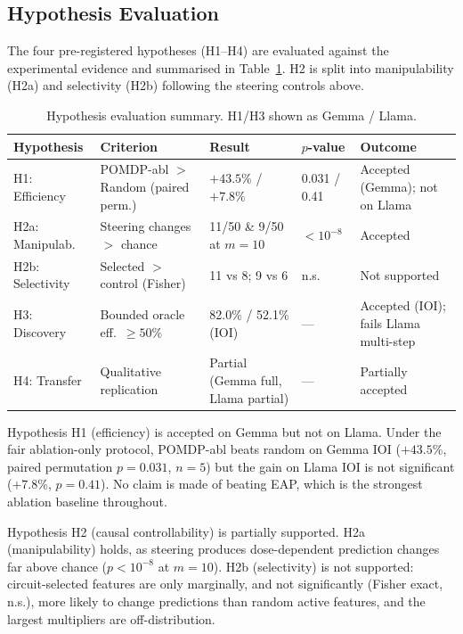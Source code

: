 \subsection{Hypothesis Evaluation}

The four pre-registered hypotheses (H1--H4) are evaluated against the
experimental evidence and summarised in
Table~\ref{tab:hypothesis_eval}.  H2 is split into manipulability
(H2a) and selectivity (H2b) following the steering controls above.

\begin{table}[H]
\centering
\caption{Hypothesis evaluation summary.  H1/H3 shown as Gemma / Llama.}
\label{tab:hypothesis_eval}
{\footnotesize
\begin{tabular}{p{2.0cm}p{3.4cm}p{2.6cm}p{1.8cm}p{2.4cm}}
\toprule
\textbf{Hypothesis} & \textbf{Criterion} & \textbf{Result} & \textbf{$p$-value} & \textbf{Outcome} \\
\midrule
H1: Efficiency  & POMDP-abl $>$ Random (paired perm.) & $+43.5\%$ / $+7.8\%$ & 0.031 / 0.41 & Accepted (Gemma); not on Llama \\
H2a: Manipulab. & Steering changes $>$ chance & 11/50 \& 9/50 at $m{=}10$ & $<10^{-8}$ & Accepted \\
H2b: Selectivity & Selected $>$ control (Fisher) & 11 vs 8; 9 vs 6 & n.s. & Not supported \\
H3: Discovery    & Bounded oracle eff.\ $\geq 50\%$ & 82.0\% / 52.1\% (IOI) & --- & Accepted (IOI); fails Llama multi-step \\
H4: Transfer     & Qualitative replication & Partial (Gemma full, Llama partial) & --- & Partially accepted \\
\bottomrule
\end{tabular}%
}
\end{table}

Hypothesis H1 (efficiency) is accepted on Gemma but not on Llama. Under the fair
ablation-only protocol, POMDP-abl beats random on Gemma IOI ($+43.5\%$,
paired permutation $p=0.031$, $n=5$) but the gain on Llama IOI is not significant
($+7.8\%$, $p=0.41$). No claim is made of beating EAP, which is the strongest
ablation baseline throughout.

Hypothesis H2 (causal controllability) is partially supported. H2a (manipulability)
holds, as steering produces dose-dependent prediction changes far above chance
($p<10^{-8}$ at $m{=}10$). H2b (selectivity) is not supported: circuit-selected
features are only marginally, and not significantly (Fisher exact, n.s.), more
likely to change predictions than random active features, and the largest
multipliers are off-distribution.

